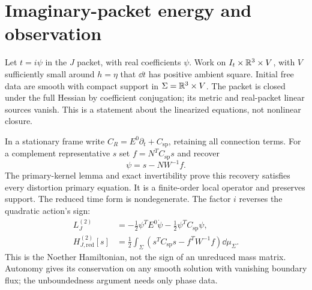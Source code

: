 \section{Imaginary-packet energy and observation}
\label{sec:imaginary}

Let $t=i\psi$ in the $J$ packet, with real coefficients $\psi$.
Work on $I_t\times\mathbb R^3\times V$, with $V$ sufficiently small around
$h=\eta$ that $\dd t$ has positive ambient square. Initial free data are
smooth with compact support in $\Sigma=\mathbb R^3\times V$.
The packet is closed under the full Hessian by coefficient conjugation;
its metric and real-packet linear sources vanish. This is a statement
about the linearized equations, not nonlinear closure.

In a stationary frame write $C_R=E^0\partial_t+C_{\mathrm{sp}}$,
retaining all connection terms. For a complement representative $s$ set
$f=N^TC_{\mathrm{sp}}s$ and recover
\begin{equation}
 \psi=s-NW^{-1}f.\label{eq:recoverJ}
\end{equation}
The primary-kernel lemma and exact invertibility prove this recovery
satisfies every distortion primary equation. It is a finite-order local
operator and preserves support. The reduced time form is nondegenerate.
The factor $i$ reverses the quadratic action's sign:
\begin{align}
 L_J^{(2)}&=-\tfrac12\psi^TE^0\dot\psi
                -\tfrac12\psi^TC_{\mathrm{sp}}\psi,\nonumber\\
 H_{J,\mathrm{red}}^{(2)}[s]
 &=\frac12\int_\Sigma
       \left(s^TC_{\mathrm{sp}}s-f^TW^{-1}f\right)\dd\mu_\Sigma.
 \label{eq:HJ}
\end{align}
This is the Noether Hamiltonian, not the sign of an unreduced mass matrix.
Autonomy gives its conservation on any smooth solution with vanishing
boundary flux; the unboundedness argument needs only phase data.

